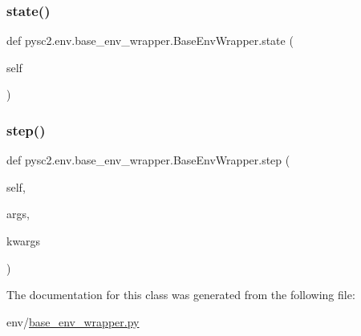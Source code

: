 \subsubsection{\texorpdfstring{state()}{state()}}
{\footnotesize\ttfamily def pysc2.\+env.\+base\+\_\+env\+\_\+wrapper.\+Base\+Env\+Wrapper.\+state (\begin{DoxyParamCaption}\item[{}]{self }\end{DoxyParamCaption})}

\mbox{\label{classpysc2_1_1env_1_1base__env__wrapper_1_1_base_env_wrapper_ab491e6f3a60fb773ba3573ebbd49cfc5}} 
\subsubsection{\texorpdfstring{step()}{step()}}
{\footnotesize\ttfamily def pysc2.\+env.\+base\+\_\+env\+\_\+wrapper.\+Base\+Env\+Wrapper.\+step (\begin{DoxyParamCaption}\item[{}]{self,  }\item[{}]{args,  }\item[{}]{kwargs }\end{DoxyParamCaption})}



The documentation for this class was generated from the following file\+:\begin{DoxyCompactItemize}
\item 
env/\mbox{\hyperlink{base__env__wrapper_8py}{base\+\_\+env\+\_\+wrapper.\+py}}\end{DoxyCompactItemize}
